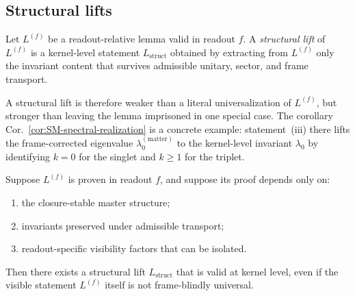 \subsection*{Structural lifts}

\begin{definition}
\label{def:structural-lift}
Let $L^{(f)}$ be a readout-relative lemma valid in readout $f$.
A \emph{structural lift} of $L^{(f)}$ is a kernel-level statement
$L_{\mathrm{struct}}$ obtained by extracting from $L^{(f)}$ only the
invariant content that survives admissible unitary, sector, and frame
transport.
\end{definition}

\begin{remark}
A structural lift is therefore weaker than a literal universalization of
$L^{(f)}$, but stronger than leaving the lemma imprisoned in one special
case. The corollary Cor.~\ref{cor:SM-spectral-realization} is a concrete
example: statement~(iii) there lifts the frame-corrected eigenvalue
$\lambda_0^{(\mathrm{matter})}$ to the kernel-level invariant $\lambda_0$
by identifying $k=0$ for the singlet and $k\ge 1$ for the triplet.
\end{remark}

\begin{proposition}
\label{prop:structural-lift-principle}
Suppose $L^{(f)}$ is proven in readout $f$, and suppose its proof
depends only on:
\begin{enumerate}[label=(\roman*)]
  \item the closure-stable master structure;
  \item invariants preserved under admissible transport;
  \item readout-specific visibility factors that can be isolated.
\end{enumerate}
Then there exists a structural lift $L_{\mathrm{struct}}$ that is valid
at kernel level, even if the visible statement $L^{(f)}$ itself is not
frame-blindly universal.
\end{proposition}

